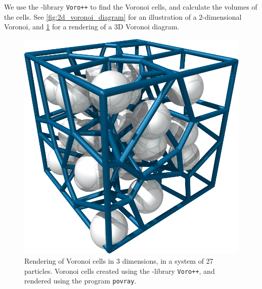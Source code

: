 We use the \cpp-library \texttt{Voro++} to find the Voronoi cells, and calculate the volumes of the cells. See \cref{fig:2d_voronoi_diagram} for an illustration of a 2-dimensional Voronoi, and \cref{fig:3d_voronoi_diagram} for a rendering of a 3D Voronoi diagram.
%
\begin{figure}[htpb]%
    \begin{minipage}[t]{0.485\textwidth}%
        \captionsetup{width=\textwidth}%
        \centering%
        \caption{%
            Illustration of Voronoi cells in 2 dimensions. Freely after Wikipedia Commons\cite{wikiVoronoiImage}.%
            \label{fig:2d_voronoi_diagram}%
        }%
    \end{minipage}%
    \hfill%
    \begin{minipage}[t]{0.485\textwidth}%
    \captionsetup{width=\textwidth}%
        \centering%
        \includegraphics[height=0.7\textwidth]{images/voronoi/3d_diagram04_crop.png}%
        \caption{%
            Rendering of Voronoi cells in 3 dimensions, in a system of 27 particles. Voronoi cells created using the \cpp-library \texttt{Voro++}\cite{rycroft2009voro,webvoro++}, and rendered using the program \texttt{povray}\cite{webpovray}. %
            \label{fig:3d_voronoi_diagram}%
        }%
    \end{minipage}%
\end{figure}%

